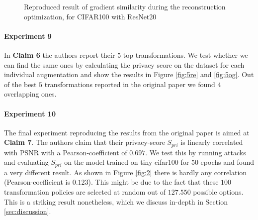 \begin{figure}[htb]
    \centering
    
    \hspace{5mm}
    \caption{Reproduced result of gradient similarity during the reconstruction optimization, for CIFAR100 with ResNet20}
    \label{fig:6}
    \vspace{-5mm}
\end{figure}

\paragraph{Experiment 9} In \textbf{Claim 6} the authors report their $5$ top transformations. We test whether we can find the same ones by calculating the privacy score on the dataset for each individual augmentation and show the results in Figure \ref{fig:5re} and \ref{fig:5og}. Out of the best $5$ transformations reported in the original paper we found $4$ overlapping ones. 

\paragraph{Experiment 10} The final experiment reproducing the results from the original paper is aimed at \textbf{Claim 7}. The authors claim that their privacy-score $S_{pri}$ is linearly correlated with PSNR with a Pearson-coefficient of $0.697$. We test this by running attacks and evaluating $S_{pri}$ on the model trained on tiny cifar100 for 50 epochs and found a very different result. As shown in Figure \ref{fig:2} there is hardly any correlation (Pearson-coefficient is $0.123$). This might be due to the fact that these $100$ transformation policies are selected at random out of $127.550$ possible options. This is a striking result nonetheless, which we discuss in-depth in Section \ref{sec:discussion}.

